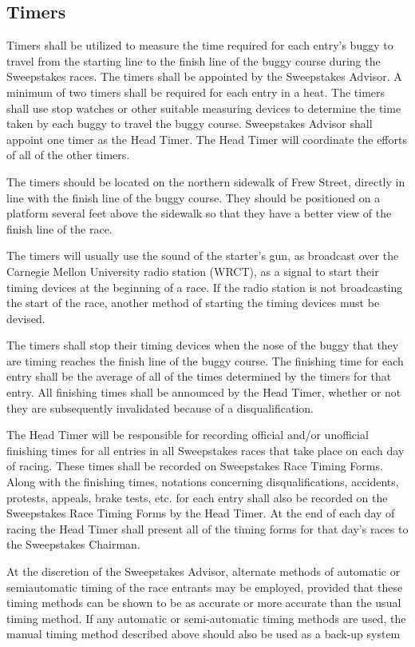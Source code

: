 \documentclass[openany]{book}
\begin{document}
\subsection{Timers}

Timers shall be utilized to measure the time required for each entry's buggy to travel from the starting line to the finish line of the buggy course during the Sweepstakes races. The timers shall be appointed by the Sweepstakes Advisor. A minimum of two timers shall be required for each entry in a heat. The timers shall use stop watches or other suitable measuring devices to determine the time taken by each buggy to travel the buggy course. Sweepstakes Advisor shall appoint one timer as the Head Timer. The Head Timer will coordinate the efforts of all of the other timers.

The timers should be located on the northern sidewalk of Frew Street, directly in line with the finish line of the buggy course. They should be positioned on a platform several feet above the sidewalk so that they have a better view of the finish line of the race.

The timers will usually use the sound of the starter's gun, as broadcast over the Carnegie Mellon University radio station (WRCT), as a signal to start their timing devices at the beginning of a race. If the radio station is not broadcasting the start of the race, another method of starting the timing devices must be devised.

The timers shall stop their timing devices when the nose of the buggy that they are timing reaches the finish line of the buggy course. The finishing time for each entry shall be the average of all of the times determined by the timers for that entry. All finishing times shall be announced by the Head Timer, whether or not they are subsequently invalidated because of a disqualification.

The Head Timer will be responsible for recording official and/or unofficial finishing times for all entries in all Sweepstakes races that take place on each day of racing. These times shall be recorded on Sweepstakes Race Timing Forms. Along with the finishing times, notations concerning disqualifications, accidents, protests, appeals, brake tests, etc. for each entry shall also be recorded on the Sweepstakes Race Timing Forms by the Head Timer. At the end of each day of racing the Head Timer shall present all of the timing forms for that day's races to the Sweepstakes Chairman.

At the discretion of the Sweepstakes Advisor, alternate methods of automatic or semiautomatic timing of the race entrants may be employed, provided that these timing methods can be shown to be as accurate or more accurate than the usual timing method. If any automatic or semi-automatic timing methods are used, the manual timing method described above should also be used as a back-up system
\end{document}
